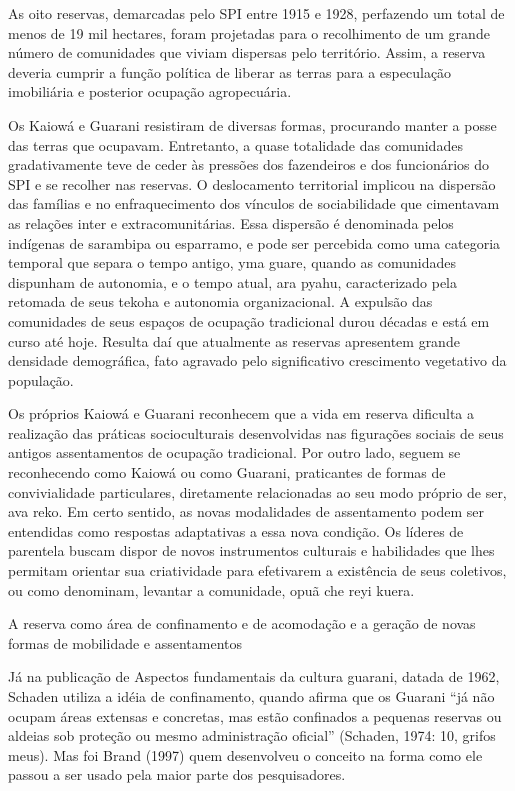 \documentclass{article}
\begin{document}
As oito reservas, demarcadas pelo SPI entre 1915 e 1928, perfazendo um
total de menos de 19 mil hectares, foram projetadas para o recolhimento
de um grande n\'umero de comunidades que viviam dispersas pelo
territ\'orio. Assim, a reserva deveria cumprir a fun\c{c}\~ao
pol\'itica de liberar as terras para a especula\c{c}\~ao imobili\'aria
e posterior ocupa\c{c}\~ao agropecu\'aria. 

Os Kaiow\'a e Guarani resistiram de diversas formas, procurando manter a
posse das terras que ocupavam. Entretanto, a quase totalidade das
comunidades gradativamente teve de ceder \`as press\~oes dos
fazendeiros e dos funcion\'arios do SPI e se recolher nas reservas. O
deslocamento territorial implicou na dispers\~ao das fam\'ilias e no
enfraquecimento dos v\'inculos de sociabilidade que cimentavam as
rela\c{c}\~oes inter e extracomunit\'arias. Essa dispers\~ao \'e
denominada pelos ind\'igenas de sarambipa ou esparramo, e pode ser
percebida como uma categoria temporal que separa o tempo antigo, yma
guare, quando as comunidades dispunham de autonomia, e o tempo atual,
ara pyahu, caracterizado pela retomada de seus tekoha e autonomia
organizacional. A expuls\~ao das comunidades de seus espa\c{c}os de
ocupa\c{c}\~ao tradicional durou d\'ecadas e est\'a em curso at\'e
hoje. Resulta da\'i que atualmente as reservas apresentem grande
densidade demogr\'afica, fato agravado pelo significativo crescimento
vegetativo da popula\c{c}\~ao.

Os pr\'oprios Kaiow\'a e Guarani reconhecem que a vida em reserva
dificulta a realiza\c{c}\~ao das pr\'aticas socioculturais
desenvolvidas nas figura\c{c}\~oes sociais de seus antigos
assentamentos de ocupa\c{c}\~ao tradicional. Por outro lado, seguem se
reconhecendo como Kaiow\'a ou como Guarani, praticantes de formas de
convivialidade particulares, diretamente relacionadas ao seu modo
pr\'oprio de ser, ava reko. Em certo sentido, as novas modalidades de
assentamento podem ser entendidas como respostas adaptativas a essa
nova condi\c{c}\~ao. Os l\'ideres de parentela buscam dispor de novos
instrumentos culturais e habilidades que lhes permitam orientar sua
criatividade para efetivarem a exist\^encia de seus coletivos, ou como
denominam, levantar a comunidade, opu{\textasciiacute}\~a che
re{\textasciiacute}yi kuera.

A reserva como \'area de confinamento e de acomoda\c{c}\~ao e a
gera\c{c}\~ao de novas formas de mobilidade e assentamentos

J\'a na publica\c{c}\~ao de Aspectos fundamentais da cultura guarani,
datada de 1962, Schaden utiliza a id\'eia de confinamento, quando
afirma que os Guarani {\textquotedblleft}j\'a n\~ao ocupam \'areas
extensas e concretas, mas est\~ao confinados a pequenas reservas ou
aldeias sob prote\c{c}\~ao ou mesmo administra\c{c}\~ao
oficial{\textquotedblright} (Schaden, 1974: 10, grifos meus). Mas foi
Brand (1997) quem desenvolveu o conceito na forma como ele passou a ser
usado pela maior parte dos pesquisadores.
\end{document}
